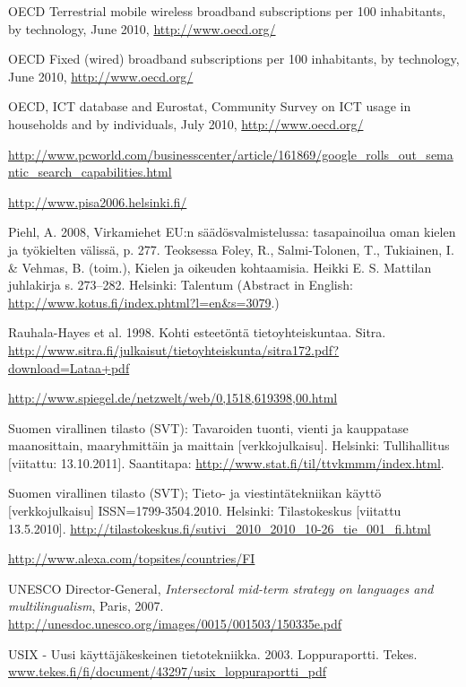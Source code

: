 \documentclass{../../metanetpaper}
\begin{document}
\begin{Parallel}[c]{79mm}{78mm}
\begin{thebibliography}{102}
OECD Terrestrial mobile wireless broadband subscriptions per 100 inhabitants,
by technology, June 2010, \url{http://www.oecd.org/}

OECD Fixed (wired) broadband subscriptions per 100 inhabitants, by
technology, June 2010, \url{http://www.oecd.org/}

OECD, ICT database and Eurostat, Community Survey on ICT usage in households
and by individuals, July 2010, \url{http://www.oecd.org/}

\url{http://www.pcworld.com/businesscenter/article/161869/google_rolls_out_semantic_search_capabilities.html}

\url{http://www.pisa2006.helsinki.fi/}

Piehl, A. 2008, Virkamiehet EU:n säädösvalmistelussa: tasapainoilua oman
kielen ja työkielten välissä, p. 277. Teoksessa Foley, R., Salmi-Tolonen, T.,
Tukiainen, I. \& Vehmas, B. (toim.), Kielen ja oikeuden kohtaamisia. Heikki E.
S. Mattilan juhlakirja s. 273–282. Helsinki: Talentum (Abstract in English:
\url{http://www.kotus.fi/index.phtml?l=en&s=3079}.)

Rauhala-Hayes et al. 1998. Kohti esteetöntä tietoyhteiskuntaa. Sitra.
\url{http://www.sitra.fi/julkaisut/tietoyhteiskunta/sitra172.pdf?download=Lataa+pdf}

\url{http://www.spiegel.de/netzwelt/web/0,1518,619398,00.html}

Suomen virallinen tilasto (SVT): Tavaroiden tuonti, vienti ja kauppatase
maanosittain, maaryhmittäin ja maittain [verkkojulkaisu]. Helsinki:
Tullihallitus [viitattu: 13.10.2011].
Saantitapa: \url{http://www.stat.fi/til/ttvkmmm/index.html}.

Suomen virallinen tilasto (SVT); Tieto- ja viestintätekniikan käyttö
[verkkojulkaisu] ISSN=1799-3504.2010. Helsinki: Tilastokeskus [viitattu
13.5.2010].
\url{http://tilastokeskus.fi/sutivi_2010_2010_10-26_tie_001_fi.html}

\url{http://www.alexa.com/topsites/countries/FI}

UNESCO Director-General,
\emph{Intersectoral mid-term strategy on languages and multilingualism},
Paris, 2007.
\url{http://unesdoc.unesco.org/images/0015/001503/150335e.pdf}

USIX - Uusi käyttäjäkeskeinen tietotekniikka. 2003. Loppuraportti. Tekes.
\url{www.tekes.fi/fi/document/43297/usix_loppuraportti_pdf}


\end{thebibliography}
\end{Parallel}
\end{document}

